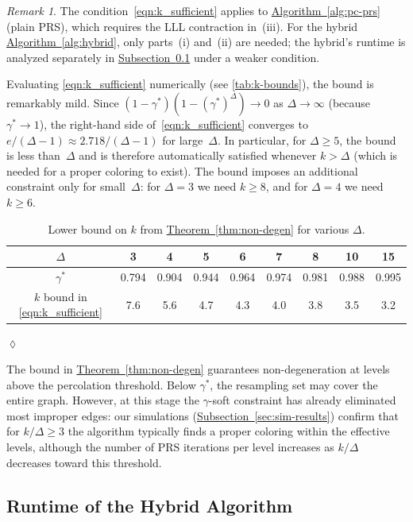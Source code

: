 \documentclass[12pt, a4paper]{article}
\theoremstyle{plain}
\theoremstyle{definition}
\theoremstyle{remark}
\newtheorem{remark}{Remark}
\newcommand{\sref}[2]{\hyperref[#2]{#1~\ref*{#2}}}
\begin{document}
\begin{remark}\normalfont
The condition~\eqref{eqn:k_sufficient} applies to \sref{Algorithm}{alg:pc-prs} (plain PRS), which requires the LLL contraction in~(iii). For the hybrid \sref{Algorithm}{alg:hybrid}, only parts~(i) and~(ii) are needed; the hybrid's runtime is analyzed separately in \sref{Subsection}{sec:hybrid-runtime} under a weaker condition.

Evaluating \eqref{eqn:k_sufficient} numerically (see \autoref{tab:k-bounds}), the bound is remarkably mild. Since \((1-\gamma^*)(1-(\gamma^*)^{\Delta})\to0\) as \(\Delta\to\infty\) (because \(\gamma^*\to1\)), the right-hand side of~\eqref{eqn:k_sufficient} converges to \(e/(\Delta-1)\approx 2.718/(\Delta-1)\) for large~\(\Delta\). In particular, for \(\Delta\geq5\), the bound is less than~\(\Delta\) and is therefore automatically satisfied whenever \(k>\Delta\) (which is needed for a proper coloring to exist). The bound imposes an additional constraint only for small~\(\Delta\): for \(\Delta=3\) we need \(k\geq8\), and for \(\Delta=4\) we need \(k\geq6\).

\begin{table}[ht]
\centering
\begin{tabular}{c|cccccccc}
\(\Delta\) & 3 & 4 & 5 & 6 & 7 & 8 & 10 & 15 \\
\hline
\(\gamma^*\) & 0.794 & 0.904 & 0.944 & 0.964 & 0.974 & 0.981 & 0.988 & 0.995\\
\(k\) bound in \eqref{eqn:k_sufficient} & 7.6 & 5.6 & 4.7 & 4.3 & 4.0 & 3.8 & 3.5 & 3.2\\
\end{tabular}
\caption{Lower bound on \(k\) from \sref{Theorem}{thm:non-degen} for various \(\Delta\).}
\label{tab:k-bounds}
\end{table}
\hfill\(\lozenge\)
\end{remark}

The bound in \sref{Theorem}{thm:non-degen} guarantees non-degeneration at levels above the percolation threshold. Below \(\gamma^*\), the resampling set may cover the entire graph. However, at this stage the \(\gamma\)-soft constraint has already eliminated most improper edges: our simulations (\sref{Subsection}{sec:sim-results}) confirm that for \(k/\Delta\geq3\) the algorithm typically finds a proper coloring within the effective levels, although the number of PRS iterations per level increases as \(k/\Delta\) decreases toward this threshold.

\subsection{Runtime of the Hybrid Algorithm}\label{sec:hybrid-runtime}
\end{document}
